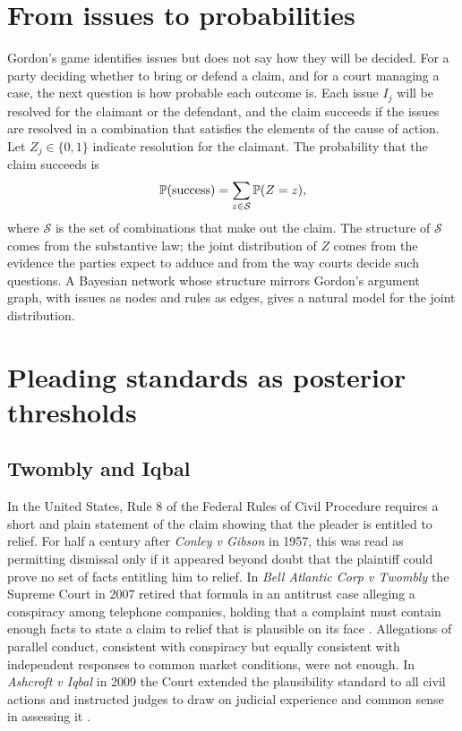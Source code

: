 \section{From issues to probabilities}

Gordon's game identifies issues but does not say how they will be decided. For a party deciding whether to bring or defend a claim, and for a court managing a case, the next question is how probable each outcome is. Each issue $I_j$ will be resolved for the claimant or the defendant, and the claim succeeds if the issues are resolved in a combination that satisfies the elements of the cause of action. Let $Z_j \in\{0,1\}$ indicate resolution for the claimant. The probability that the claim succeeds is
\begin{equation}
\mathbb{P}(\text{success}) = \sum_{z \in \mathcal{S}} \mathbb{P}(Z = z),
\end{equation}
where $\mathcal{S}$ is the set of combinations that make out the claim. The structure of $\mathcal{S}$ comes from the substantive law; the joint distribution of $Z$ comes from the evidence the parties expect to adduce and from the way courts decide such questions. A Bayesian network whose structure mirrors Gordon's argument graph, with issues as nodes and rules as edges, gives a natural model for the joint distribution.

\section{Pleading standards as posterior thresholds}

\subsection{Twombly and Iqbal}

In the United States, Rule 8 of the Federal Rules of Civil Procedure requires a short and plain statement of the claim showing that the pleader is entitled to relief. For half a century after \emph{Conley v Gibson} in 1957, this was read as permitting dismissal only if it appeared beyond doubt that the plaintiff could prove no set of facts entitling him to relief. In \emph{Bell Atlantic Corp v Twombly} the Supreme Court in 2007 retired that formula in an antitrust case alleging a conspiracy among telephone companies, holding that a complaint must contain enough facts to state a claim to relief that is plausible on its face \citep{twombly2007}. Allegations of parallel conduct, consistent with conspiracy but equally consistent with independent responses to common market conditions, were not enough. In \emph{Ashcroft v Iqbal} in 2009 the Court extended the plausibility standard to all civil actions and instructed judges to draw on judicial experience and common sense in assessing it \citep{iqbal2009}.

